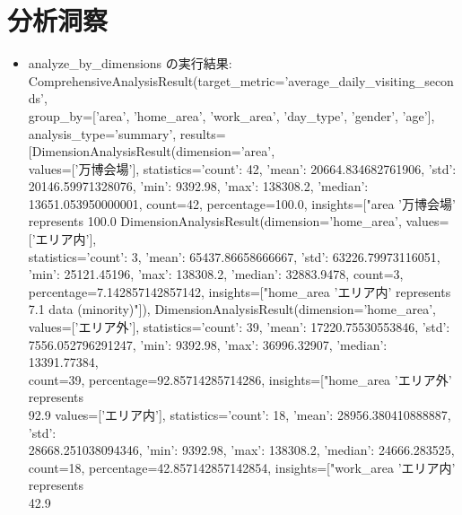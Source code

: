 \documentclass[11pt,a4paper]{article}
\begin{document}
\section{分析洞察}
\begin{itemize}
\item analyze\_by\_dimensions の実行結果:\\
ComprehensiveAnalysisResult(target\_metric='average\_daily\_visiting\_seconds',\\
group\_by=['area', 'home\_area', 'work\_area', 'day\_type', 'gender', 'age'],\\
analysis\_type='summary', results=[DimensionAnalysisResult(dimension='area',\\
values=['万博会場'], statistics={'count': 42, 'mean': 20664.834682761906, 'std':\\
20146.59971328076, 'min': 9392.98, 'max': 138308.2, 'median':\\
13651.053950000001}, count=42, percentage=100.0, insights=["area '万博会場'\\
represents 100.0%
DimensionAnalysisResult(dimension='home\_area', values=['エリア内'],\\
statistics={'count': 3, 'mean': 65437.86658666667, 'std': 63226.79973116051,\\
'min': 25121.45196, 'max': 138308.2, 'median': 32883.9478}, count=3,\\
percentage=7.142857142857142, insights=["home\_area 'エリア内' represents 7.1%
data (minority)"]), DimensionAnalysisResult(dimension='home\_area',\\
values=['エリア外'], statistics={'count': 39, 'mean': 17220.75530553846, 'std':\\
7556.052796291247, 'min': 9392.98, 'max': 36996.32907, 'median': 13391.77384},\\
count=39, percentage=92.85714285714286, insights=["home\_area 'エリア外' represents\\
92.9%
values=['エリア内'], statistics={'count': 18, 'mean': 28956.380410888887, 'std':\\
28668.251038094346, 'min': 9392.98, 'max': 138308.2, 'median': 24666.283525},\\
count=18, percentage=42.857142857142854, insights=["work\_area 'エリア内' represents\\
42.9%

\end{itemize}
\end{document}
